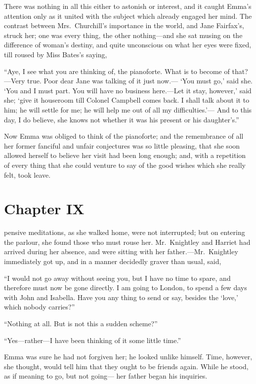 There was nothing in all this either to astonish or interest,
and it caught Emma's attention only as it united with the subject
which already engaged her mind.  The contrast between Mrs.\ Churchill's
importance in the world, and Jane Fairfax's, struck her; one was
every thing, the other nothing---and she sat musing on the difference
of woman's destiny, and quite unconscious on what her eyes were fixed,
till roused by Miss Bates's saying,

``Aye, I see what you are thinking of, the pianoforte.  What is to become
of that?---Very true.  Poor dear Jane was talking of it just now.---%
`You must go,' said she.  `You and I must part.  You will have no
business here.---Let it stay, however,' said she; `give it houseroom
till Colonel Campbell comes back.  I shall talk about it to him;
he will settle for me; he will help me out of all my difficulties.'---%
And to this day, I do believe, she knows not whether it was his
present or his daughter's.''

Now Emma was obliged to think of the pianoforte; and the remembrance
of all her former fanciful and unfair conjectures was so little pleasing,
that she soon allowed herself to believe her visit had been
long enough; and, with a repetition of every thing that she could
venture to say of the good wishes which she really felt, took leave.



\chapter{Chapter IX}


 pensive meditations, as she walked home, were not interrupted;
but on entering the parlour, she found those who must rouse her.
Mr.\ Knightley and Harriet had arrived during her absence, and were
sitting with her father.---Mr.\ Knightley immediately got up, and in a
manner decidedly graver than usual, said,

``I would not go away without seeing you, but I have no time to spare,
and therefore must now be gone directly.  I am going to London,
to spend a few days with John and Isabella.  Have you any thing to
send or say, besides the `love,' which nobody carries?''

``Nothing at all.  But is not this a sudden scheme?''

``Yes---rather---I have been thinking of it some little time.''

Emma was sure he had not forgiven her; he looked unlike himself.
Time, however, she thought, would tell him that they ought to be
friends again.  While he stood, as if meaning to go, but not going---%
her father began his inquiries.

